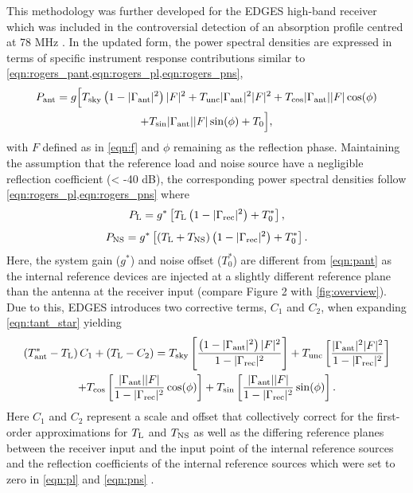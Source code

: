This methodology was further developed for the EDGES high-band receiver which was included in the controversial detection of an absorption profile centred at 78 MHz \citep{edgesNature}. In the updated form, the power spectral densities are expressed in terms of specific instrument response contributions similar to \cref{eqn:rogers_pant,eqn:rogers_pl,eqn:rogers_pns},
\begin{multline}
    P_{\mathrm{ant}} = g \Big[ T_{\mathrm{sky}} \left( 1 - |\Gamma_{\mathrm{ant}}|^2 \right) |F|^2 + T_{\mathrm{unc}}|\Gamma_{\mathrm{ant}}|^2|F|^2 + T_{\mathrm{cos}}|\Gamma_{\mathrm{ant}}||F|\cos(\phi) \\
    + T_{\mathrm{sin}}|\Gamma_{\mathrm{ant}}||F|\sin(\phi) + T_0 \Big],
    \label{eqn:pant}
\end{multline}
with $F$ defined as in \cref{eqn:f} and $\phi$ remaining as the reflection phase. Maintaining the assumption that the reference load and noise source have a negligible reflection coefficient (< -40 dB), the corresponding power spectral densities follow \cref{eqn:rogers_pl,eqn:rogers_pns} where
\begin{equation}
    P_{\mathrm{L}} = g^* \left[ T_{\mathrm{L}} \left( 1 - |\Gamma_{\mathrm{rec}}|^2 \right) + T_0^* \right],
    \label{eqn:pl}
\end{equation}
\begin{equation}
    P_{\mathrm{NS}} = g^* \left[ \left( T_{\mathrm{L}} + T_{\mathrm{NS}} \right) \left( 1 - |\Gamma_{\mathrm{rec}}|^2 \right) + T_0^* \right].
    \label{eqn:pns}
\end{equation}
Here, the system gain ($g^*$) and noise offset ($T_0^*$) are different from \cref{eqn:pant} as the internal reference devices are injected at a slightly different reference plane than the antenna at the receiver input (compare \citet{edgesCal} Figure 2 with \cref{fig:overview}). Due to this, EDGES introduces two corrective terms, $C_1$ and $C_2$, when expanding \cref{eqn:tant_star} yielding
\begin{multline}
    \left( T_{\mathrm{ant}}^* - T_{\mathrm{L}} \right)C_1 + \left( T_{\mathrm{L}} - C_2 \right) = T_{\mathrm{sky}}\left[ \frac{\left(1-|\Gamma_{\mathrm{ant}}|^2\right)|F|^2}{1 - |\Gamma_{\mathrm{rec}}|^2} \right] + T_{\mathrm{unc}}\left[\frac{|\Gamma_{\mathrm{ant}}|^2|F|^2}{1 - |\Gamma_{\mathrm{rec}}|^2} \right] \\
    + T_{\mathrm{cos}}\left[ \frac{|\Gamma_{\mathrm{ant}}||F|}{1 - |\Gamma_{\mathrm{rec}}|^2}\cos(\phi) \right] + T_{\mathrm{sin}}\left[ \frac{|\Gamma_{\mathrm{ant}}||F|}{1 - |\Gamma_{\mathrm{rec}}|^2}\sin(\phi)\right].
    \label{eqn:edges_second_calibrated_temperature}
\end{multline}
Here $C_1$ and $C_2$ represent a scale and offset that collectively correct for the first-order approximations for $T_{\mathrm{L}}$ and $T_{\mathrm{NS}}$ as well as the differing reference planes between the receiver input and the input point of the internal reference sources and the reflection coefficients of the internal reference sources which were set to zero in \cref{eqn:pl} and \cref{eqn:pns} \citep{edgesCal}.

